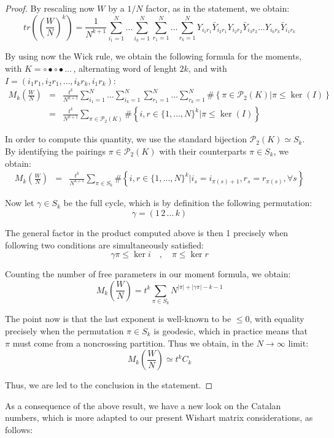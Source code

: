 \documentclass[12pt]{amsbook}
\begin{document}
\begin{proof}
By rescaling now $W$ by a $1/N$ factor, as in the statement, we obtain:
$$tr\left(\left(\frac{W}{N}\right)^k\right)=\frac{1}{N^{k+1}}\sum_{i_1=1}^N\ldots\sum_{i_k=1}^N\sum_{r_1=1}^N\ldots\sum_{r_k=1}^NY_{i_1r_1}\bar{Y}_{i_2r_1}Y_{i_2r_2}\bar{Y}_{i_3r_2}\ldots Y_{i_kr_k}\bar{Y}_{i_1r_k}$$

By using now the Wick rule, we obtain the following formula for the moments, with $K=\circ\bullet\circ\bullet\ldots\,$, alternating word of lenght $2k$, and with $I=(i_1r_1,i_2r_1,\ldots,i_kr_k,i_1r_k)$:
\begin{eqnarray*}
M_k\left(\frac{W}{N}\right)
&=&\frac{t^k}{N^{k+1}}\sum_{i_1=1}^N\ldots\sum_{i_k=1}^N\sum_{r_1=1}^N\ldots\sum_{r_k=1}^N\#\left\{\pi\in\mathcal P_2(K)\Big|\pi\leq\ker(I)\right\}\\
&=&\frac{t^k}{N^{k+1}}\sum_{\pi\in\mathcal P_2(K)}\#\left\{i,r\in\{1,\ldots,N\}^k\Big|\pi\leq\ker(I)\right\}
\end{eqnarray*}

In order to compute this quantity, we use the standard bijection $\mathcal P_2(K)\simeq S_k$. By identifying the pairings $\pi\in\mathcal P_2(K)$ with their counterparts $\pi\in S_k$, we obtain:
\begin{eqnarray*}
M_k\left(\frac{W}{N}\right)
&=&\frac{t^k}{N^{k+1}}\sum_{\pi\in S_k}\#\left\{i,r\in\{1,\ldots,N\}^k\Big|i_s=i_{\pi(s)+1},r_s=r_{\pi(s)},\forall s\right\}
\end{eqnarray*}

Now let $\gamma\in S_k$ be the full cycle, which is by definition the following permutation:
$$\gamma=(1 \, 2 \, \ldots \, k)$$

The general factor in the product computed above is then 1 precisely when following two conditions are simultaneously satisfied:
$$\gamma\pi\leq\ker i\quad,\quad 
\pi\leq\ker r$$

Counting the number of free parameters in our moment formula, we obtain:
$$M_k\left(\frac{W}{N}\right)
=t^k\sum_{\pi\in S_k}N^{|\pi|+|\gamma\pi|-k-1}$$

The point now is that the last exponent is well-known to be $\leq 0$, with equality precisely when the permutation $\pi\in S_k$ is geodesic, which in practice means that $\pi$ must come from a noncrossing partition. Thus we obtain, in the $N\to\infty$ limit:
$$M_k\left(\frac{W}{N}\right)\simeq t^kC_k$$

Thus, we are led to the conclusion in the statement.
\end{proof}

As a consequence of the above result, we have a new look on the Catalan numbers, which is more adapted to our present Wishart matrix considerations, as follows:
\end{document}
